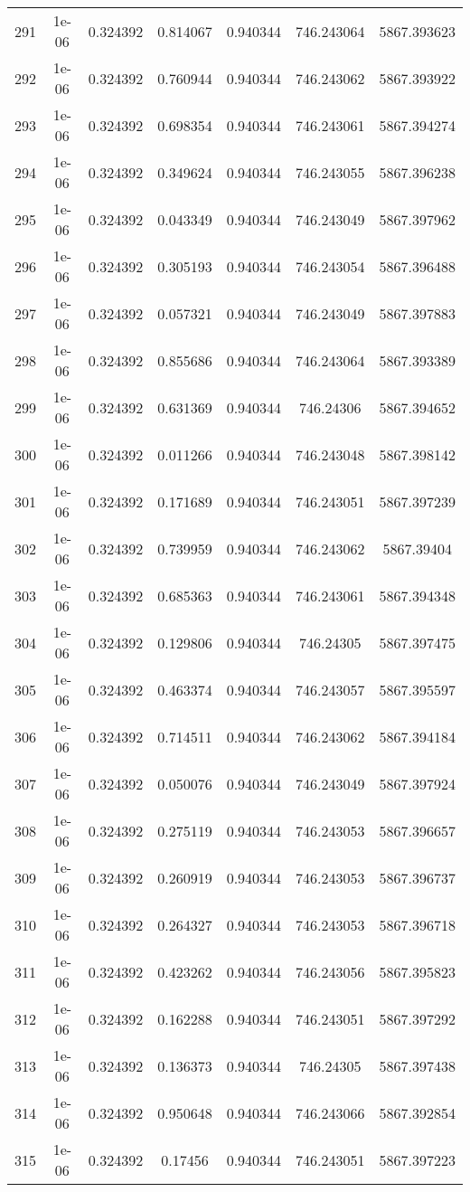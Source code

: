 \begin{table}
\begin{tabular*}{\linewidth}{c|c|c|c|c|c|c}
291 & 1e-06 & 0.324392 & 0.814067 & 0.940344 & 746.243064 & 5867.393623\\
292 & 1e-06 & 0.324392 & 0.760944 & 0.940344 & 746.243062 & 5867.393922\\
293 & 1e-06 & 0.324392 & 0.698354 & 0.940344 & 746.243061 & 5867.394274\\
294 & 1e-06 & 0.324392 & 0.349624 & 0.940344 & 746.243055 & 5867.396238\\
295 & 1e-06 & 0.324392 & 0.043349 & 0.940344 & 746.243049 & 5867.397962\\
296 & 1e-06 & 0.324392 & 0.305193 & 0.940344 & 746.243054 & 5867.396488\\
297 & 1e-06 & 0.324392 & 0.057321 & 0.940344 & 746.243049 & 5867.397883\\
298 & 1e-06 & 0.324392 & 0.855686 & 0.940344 & 746.243064 & 5867.393389\\
299 & 1e-06 & 0.324392 & 0.631369 & 0.940344 & 746.24306 & 5867.394652\\
300 & 1e-06 & 0.324392 & 0.011266 & 0.940344 & 746.243048 & 5867.398142\\
301 & 1e-06 & 0.324392 & 0.171689 & 0.940344 & 746.243051 & 5867.397239\\
302 & 1e-06 & 0.324392 & 0.739959 & 0.940344 & 746.243062 & 5867.39404\\
303 & 1e-06 & 0.324392 & 0.685363 & 0.940344 & 746.243061 & 5867.394348\\
304 & 1e-06 & 0.324392 & 0.129806 & 0.940344 & 746.24305 & 5867.397475\\
305 & 1e-06 & 0.324392 & 0.463374 & 0.940344 & 746.243057 & 5867.395597\\
306 & 1e-06 & 0.324392 & 0.714511 & 0.940344 & 746.243062 & 5867.394184\\
307 & 1e-06 & 0.324392 & 0.050076 & 0.940344 & 746.243049 & 5867.397924\\
308 & 1e-06 & 0.324392 & 0.275119 & 0.940344 & 746.243053 & 5867.396657\\
309 & 1e-06 & 0.324392 & 0.260919 & 0.940344 & 746.243053 & 5867.396737\\
310 & 1e-06 & 0.324392 & 0.264327 & 0.940344 & 746.243053 & 5867.396718\\
311 & 1e-06 & 0.324392 & 0.423262 & 0.940344 & 746.243056 & 5867.395823\\
312 & 1e-06 & 0.324392 & 0.162288 & 0.940344 & 746.243051 & 5867.397292\\
313 & 1e-06 & 0.324392 & 0.136373 & 0.940344 & 746.24305 & 5867.397438\\
314 & 1e-06 & 0.324392 & 0.950648 & 0.940344 & 746.243066 & 5867.392854\\
315 & 1e-06 & 0.324392 & 0.17456 & 0.940344 & 746.243051 & 5867.397223\\
\end{tabular*}
\end{table}
